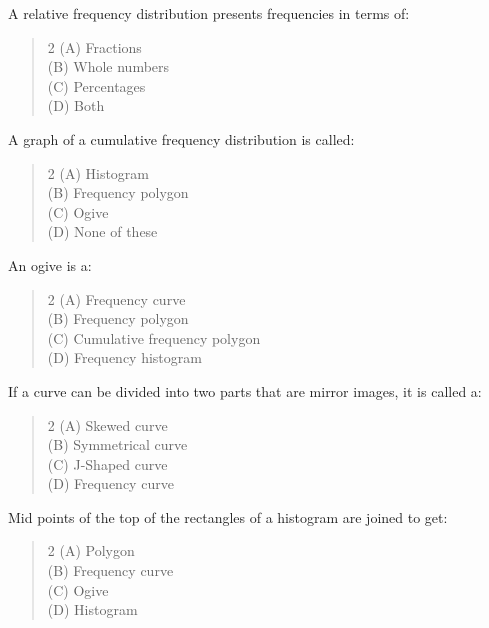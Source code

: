 \documentclass[11pt,a4paper]{article}
\begin{document}
\begin{mcqlist}
\item A relative frequency distribution presents frequencies in terms of:
\begin{quote}\begin{multicols}{2}
\noindent (A) Fractions \\
(B) Whole numbers \\
(C) Percentages \\
(D) Both
\end{multicols}\end{quote}

\item A graph of a cumulative frequency distribution is called:
\begin{quote}\begin{multicols}{2}
\noindent (A) Histogram \\
(B) Frequency polygon \\
(C) Ogive \\
(D) None of these
\end{multicols}\end{quote}

\item An ogive is a:
\begin{quote}\begin{multicols}{2}
\noindent (A) Frequency curve \\
(B) Frequency polygon \\
(C) Cumulative frequency polygon \\
(D) Frequency histogram
\end{multicols}\end{quote}

\item If a curve can be divided into two parts that are mirror images, it is called a:
\begin{quote}\begin{multicols}{2}
\noindent (A) Skewed curve \\
(B) Symmetrical curve \\
(C) J-Shaped curve \\
(D) Frequency curve
\end{multicols}\end{quote}

\item Mid points of the top of the rectangles of a histogram are joined to get:
\begin{quote}\begin{multicols}{2}
\noindent (A) Polygon \\
(B) Frequency curve \\
(C) Ogive \\
(D) Histogram
\end{multicols}\end{quote}


\end{mcqlist}
\end{document}

